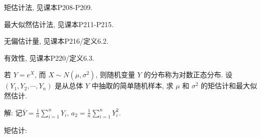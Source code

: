 \documentclass[standard]{ExBook}
\renewenvironment{shaded}{%
  \def\FrameCommand{\fboxsep=\FrameSep \colorbox{shadecolor}}%
  \MakeFramed{\advance\hsize-\width \FrameRestore}%
}{%
  \endMakeFramed
}
\begin{document}
\begin{qitems}
\textcolor{themeColor}{\selectfont {} 矩估计法, 见课本P208-P209.}

\textcolor{themeColor}{\selectfont {} 最大似然估计法, 见课本P211-P215.}

\textcolor{themeColor}{\selectfont {} 无偏估计量, 见课本P216/定义6.2.}

\textcolor{themeColor}{\selectfont {} 有效性, 见课本P220/定义6.3.}

\vspace{2.5cm-5em}

    \begin{bbox}
    \begin{shaded}
        \qitem
若 \( Y = e^X \), 而 \( X \sim N(\mu, \sigma^2) \), 则随机变量 \( Y \) 的分布称为对数正态分布. 设 \( (Y_1, Y_2, \cdots, Y_n) \) 是从总体 \( Y \) 中抽取的简单随机样本, 求 \( \mu \) 和 \( \sigma^2 \) 的矩估计和最大似然估计.
    \end{shaded}
    \end{bbox}

\vspace{\dimexpr2.5cm-5em\relax}

解: 记$\overline{Y}=\frac{1}{n}\sum_{i=1}^{n}Y_i$, $a_2=\frac{1}{n}\sum_{i=1}^{n}Y_i^2$.

 矩估计:


\end{qitems}
\end{document}
